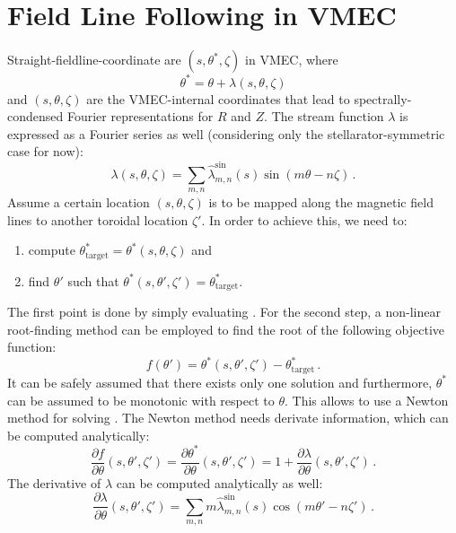 \section{Field Line Following in VMEC}
Straight-fieldline-coordinate are $(s, \theta^*, \zeta)$ in VMEC, where
\begin{equation}
 \theta^* = \theta + \lambda(s,\theta,\zeta) \label{eqn:theta_star}
\end{equation}
and $(s,\theta,\zeta)$ are the VMEC-internal coordinates
that lead to spectrally-condensed Fourier representations for $R$ and $Z$.
The stream function $\lambda$ is expressed as a Fourier series as well
(considering only the stellarator-symmetric case for now):
\begin{equation}
 \lambda(s,\theta,\zeta) = \sum\limits_{m,n} \hat{\lambda}^\textrm{sin}_{m,n}(s) \sin(m \theta - n \zeta) \, .
\end{equation}
Assume a certain location $(s,\theta,\zeta)$ is to be mapped along the magnetic field lines
to another toroidal location $\zeta'$.
In order to achieve this, we need to:
\begin{enumerate}
 \item compute $\theta^*_\textrm{target} = \theta^*(s,\theta,\zeta)$ and
 \item find $\theta'$ such that $\theta^*(s,\theta',\zeta') = \theta^*_\textrm{target}$.
\end{enumerate}
The first point is done by simply evaluating .
For the second step, a non-linear root-finding method can be employed to
find the root of the following objective function:
\begin{equation}
 f(\theta') = \theta^*(s,\theta',\zeta') - \theta^*_\textrm{target} \, . \label{eqn:theta_star_objective}
\end{equation}
It can be safely assumed that there exists only one solution
and furthermore, $\theta^*$ can be assumed to be monotonic with respect to $\theta$.
This allows to use a Newton method for solving .
The Newton method needs derivate information, which can be computed analytically:
\begin{equation}
 \frac{\partial f}{\partial \theta}(s,\theta',\zeta')
 =
 \frac{\partial \theta^*}{\partial \theta}(s,\theta',\zeta')
 =
 1 + \frac{\partial \lambda}{\partial \theta}(s,\theta',\zeta') \, . \label{eqn:df_dthetap}
\end{equation}
The derivative of $\lambda$ can be computed analytically as well:
\begin{equation}
 \frac{\partial \lambda}{\partial \theta}(s,\theta',\zeta')
 =
 \sum\limits_{m,n} m \hat{\lambda}^\textrm{sin}_{m,n}(s) \cos(m \theta' - n \zeta') \, .
\end{equation}
